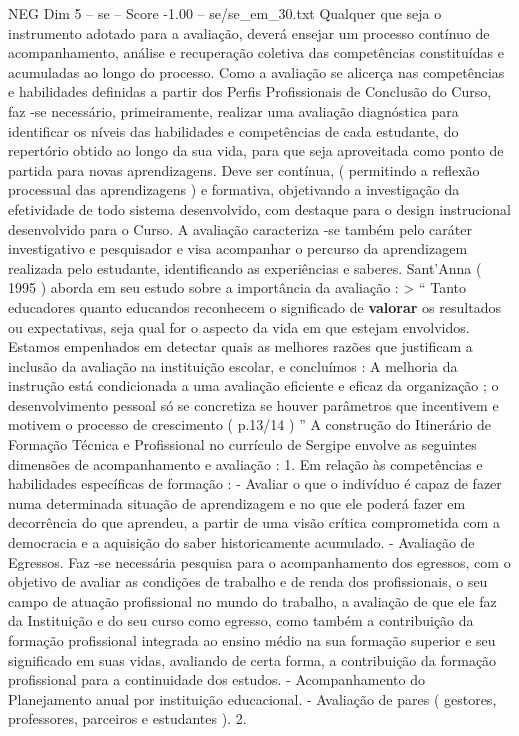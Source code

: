 \begin{textsample}{NEG Dim 5 – se – Score -1.00 – se/se\_em\_30.txt}
Qualquer que seja o instrumento adotado para a avaliação, deverá ensejar um processo contínuo de acompanhamento, análise e recuperação coletiva das competências constituídas e acumuladas ao longo do processo.
Como a avaliação se alicerça nas competências e habilidades definidas a partir dos Perfis Profissionais de Conclusão do Curso, faz -se necessário, primeiramente, realizar uma avaliação diagnóstica para identificar os níveis das habilidades e competências de cada estudante, do repertório obtido ao longo da sua vida, para que seja aproveitada como ponto de partida para novas aprendizagens.
Deve ser contínua, ( permitindo a reflexão processual das aprendizagens ) e formativa, objetivando a investigação da efetividade de todo sistema desenvolvido, com destaque para o design instrucional desenvolvido para o Curso.
A avaliação caracteriza -se também pelo caráter investigativo e pesquisador e visa acompanhar o percurso da aprendizagem realizada pelo estudante, identificando as experiências e saberes.
Sant’Anna ( 1995 ) aborda em seu estudo sobre a importância da avaliação : > “ Tanto educadores quanto educandos reconhecem o significado de \textbf{valorar} os resultados ou expectativas, seja qual for o aspecto da vida em que estejam envolvidos.
Estamos empenhados em detectar quais as melhores razões que justificam a inclusão da avaliação na instituição escolar, e concluímos : A melhoria da instrução está condicionada a uma avaliação eficiente e eficaz da organização ; o desenvolvimento pessoal só se concretiza se houver parâmetros que incentivem e motivem o processo de crescimento ( p.13/14 ) ” A construção do Itinerário de Formação Técnica e Profissional no currículo de Sergipe envolve as seguintes dimensões de acompanhamento e avaliação : 1.
Em relação às competências e habilidades específicas de formação : - Avaliar o que o indivíduo é capaz de fazer numa determinada situação de aprendizagem e no que ele poderá fazer em decorrência do que aprendeu, a partir de uma visão crítica comprometida com a democracia e a aquisição do saber historicamente acumulado. - Avaliação de Egressos.
Faz -se necessária pesquisa para o acompanhamento dos egressos, com o objetivo de avaliar as condições de trabalho e de renda dos profissionais, o seu campo de atuação profissional no mundo do trabalho, a avaliação de que ele faz da Instituição e do seu curso como egresso, como também a contribuição da formação profissional integrada ao ensino médio na sua formação superior e seu significado em suas vidas, avaliando de certa forma, a contribuição da formação profissional para a continuidade dos estudos. - Acompanhamento do Planejamento anual por instituição educacional. - Avaliação de pares ( gestores, professores, parceiros e estudantes ). 2.

\end{textsample}
